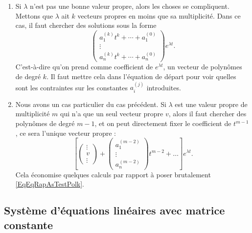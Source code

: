 \begin{enumerate}
	\item
	      Si \( \lambda\) n'est pas une bonne valeur propre, alors les choses se compliquent. Mettons que \( \lambda\) ait \( k\) vecteurs propres en moins que sa multiplicité. Dans ce cas, il faut chercher des solutions sous la forme
	      \begin{equation}		\label{EqEqRapAsTestPolk}
		      \begin{pmatrix}
			      a^{(k)}_1t^k+\cdots+a_1^{(0)} \\
			      \vdots                        \\
			      a^{(k)}_nt^k+\cdots+a_n^{(0)}
		      \end{pmatrix} e^{\lambda t}.
	      \end{equation}
	      C'est-à-dire qu'on prend comme coefficient de \(  e^{\lambda t}\), un vecteur de polynômes de degré \( k\). Il faut mettre cela dans l'équation de départ pour voir quelles sont les contraintes sur les constantes \( a_i^{(j)}\) introduites.

	\item\label{ItemRapSystDe}
	      Nous avons un cas particulier du cas précédent. Si \( \lambda\) est une valeur propre de multiplicité \( m\) qui n'a que un seul vecteur propre \( v\), alors il faut chercher des polynômes de degré \( m-1\), et on peut directement fixer le coefficient de \( t^{m-1}\), ce sera l'unique vecteur propre :
	      \begin{equation}
		      \left[
		      \begin{pmatrix}
			      \vdots \\
			      v      \\
			      \vdots
		      \end{pmatrix}+
		      \begin{pmatrix}
			      a_1^{(m-2)} \\
			      \vdots      \\
			      a_n^{(m-2)}
		      \end{pmatrix}t^{m-2}+\ldots
		      \right] e^{\lambda t}.
	      \end{equation}
	      Cela économise quelques calculs par rapport à poser brutalement \eqref{EqEqRapAsTestPolk}.

\end{enumerate}
\let\theenumi\oldTheEnumi

\subsection{Système d'équations linéaires avec matrice constante}


